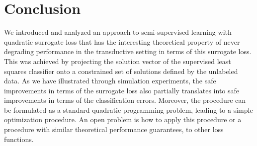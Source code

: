 \documentclass{article}
\begin{document}
\section{Conclusion}
We introduced and analyzed an approach to semi-supervised learning with quadratic surrogate loss that has the interesting theoretical property of never degrading performance in the transductive setting in terms of this surrogate loss. This was achieved by projecting the solution vector of the supervised least squares classifier onto a constrained set of solutions defined by the unlabeled data. As we have illustrated through simulation experiments, the safe improvements in terms of the surrogate loss also partially translates into safe improvements in terms of the classification errors. Moreover, the procedure can be formulated as a standard quadratic programming problem, leading to a simple optimization procedure. An open problem is how to apply this procedure or a procedure with similar theoretical performance guarantees, to other loss functions.




\end{document}
